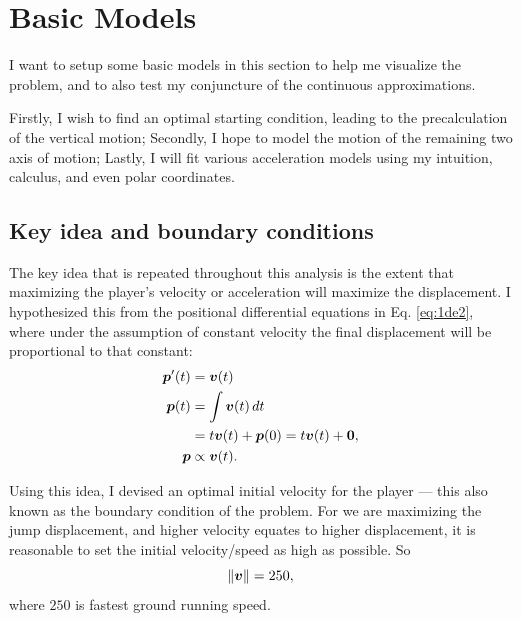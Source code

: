 
\section{Basic Models}
I want to setup some basic models in this section to  help me visualize the problem, and to also test my conjuncture of the continuous approximations.

Firstly, I wish to find an optimal starting condition, leading to the precalculation of the vertical motion; Secondly, I hope to model the motion of the remaining two axis of motion; Lastly, I will fit various acceleration models using my intuition, calculus, and even polar coordinates.

\subsection{Key idea and boundary conditions}
The key idea that is repeated throughout this analysis is the extent that maximizing the player's velocity or acceleration will maximize the displacement. I hypothesized this from the positional differential equations in Eq. \ref{eq:1de2}, where under the assumption of constant velocity the final displacement will be proportional to that constant:
\begin{align*}
    \boldsymbol{p}'(t) &= \boldsymbol{v}(t)\\
    \boldsymbol{p}(t) &= \int \boldsymbol{v}(t) \, dt\\
    &= t\boldsymbol{v}(t) + \boldsymbol{p}(0) = t\boldsymbol{v}(t) + \boldsymbol{0},\\
    \boldsymbol{p} &\propto \boldsymbol{v}(t).
\end{align*}

Using this idea, I devised an optimal initial velocity for the player --- this also known as the boundary condition of the problem. For we are maximizing the jump displacement, and higher velocity equates to higher displacement, it is reasonable to set the initial velocity/speed as high as possible. So
\[
    \|\boldsymbol{v}\| = 250,
\]
where $250$ is fastest ground running speed.


